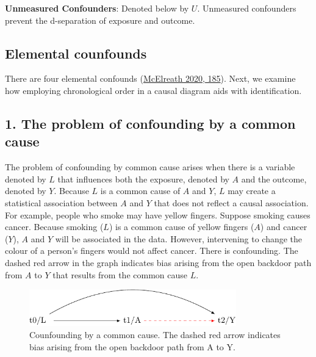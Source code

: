 \documentclass[
  singlecolumn]{report}
\begin{document}
\textbf{Unmeasured Confounders}: Denoted below by \(U\). Unmeasured
confounders prevent the d-separation of exposure and outcome.

\hypertarget{elemental-counfounds}{%
\subsection{Elemental counfounds}\label{elemental-counfounds}}

There are four elemental confounds
(\protect\hyperlink{ref-mcelreath2020}{McElreath 2020, 185}). Next, we
examine how employing chronological order in a causal diagram aids with
identification.

\hypertarget{the-problem-of-confounding-by-a-common-cause}{%
\subsection{1. The problem of confounding by a common
cause}\label{the-problem-of-confounding-by-a-common-cause}}

The problem of confounding by common cause arises when there is a
variable denoted by \(L\) that influences both the exposure, denoted by
\(A\) and the outcome, denoted by \(Y.\) Because \(L\) is a common cause
of \(A\) and \(Y\), \(L\) may create a statistical association between
\(A\) and \(Y\) that does not reflect a causal association. For example,
people who smoke may have yellow fingers. Suppose smoking causes cancer.
Because smoking (\(L\)) is a common cause of yellow fingers (\(A\)) and
cancer (\(Y\)), \(A\) and \(Y\) will be associated in the data. However,
intervening to change the colour of a person's fingers would not affect
cancer. There is confounding. The dashed red arrow in the graph
indicates bias arising from the open backdoor path from \(A\) to \(Y\)
that results from the common cause \(L\).

\begin{figure}

{\centering \includegraphics[width=0.8\textwidth,height=\textheight]{causal-dags_files/figure-pdf/fig-dag-common-cause-1.pdf}

}

\caption{\label{fig-dag-common-cause}Counfounding by a common cause. The
dashed red arrow indicates bias arising from the open backdoor path from
A to Y.}

\end{figure}
\end{document}
